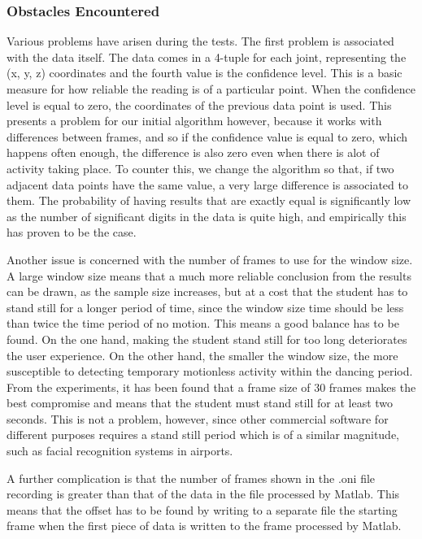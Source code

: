 \documentclass[10pt,a4paper]{article}
\begin{document}
\subsubsection{Obstacles Encountered}
\noindent
Various problems have arisen during the tests. The first problem is associated with the data itself. The data comes in a 4-tuple for each joint, representing the (x, y, z) coordinates and the fourth value is the confidence level. This is a basic measure for how reliable the reading is of a particular point. When the confidence level is equal to zero, the coordinates of the previous data point is used. This presents a problem for our initial algorithm however, because it works with differences between frames, and so if the confidence value is equal to zero, which happens often enough, the difference is also zero even when there is alot of activity taking place. To counter this, we change the algorithm so that, if two adjacent data points have the same value, a very large difference is associated to them. The probability of having results that are exactly equal is significantly low as the number of significant digits in the data is quite high, and empirically this has proven to be the case. 

\noindent
Another issue is concerned with the number of frames to use for the window size. A large window size means that a much more reliable conclusion from the results can be drawn, as the sample size increases, but at a cost that the student has to stand still for a longer period of time, since the window size time should be less than twice the time period of no motion. This means a good balance has to be found. On the one hand, making the student stand still for too long deteriorates the user experience. On the other hand, the smaller the window size, the more susceptible to detecting temporary motionless activity within the dancing period. From the experiments, it has been found that a frame size of 30 frames makes the best compromise and means that the student must stand still for at least two seconds. This is not a problem, however, since other commercial software for different purposes requires a stand still period which is of a similar magnitude, such as facial recognition systems in airports.  

\noindent
A further complication is that the number of frames shown in the .oni file recording is greater than that of the data in the file processed by Matlab. This means that the offset has to be found by writing to a separate file the starting frame when the first piece of data is written to the frame processed by Matlab. 
\end{document}
